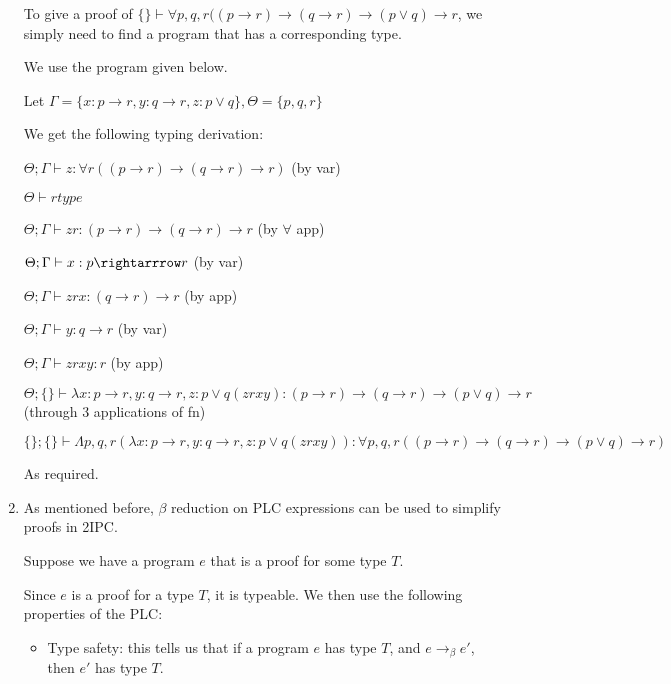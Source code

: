 \begin{enumerate}[label=(\alph*)]
    To give a proof of $\{\} \vdash \forall p,q,r ((p \rightarrow r) \rightarrow (q \rightarrow r) \rightarrow (p \vee q) \rightarrow r$, we simply need to find a program that has a corresponding type.

    We use the program given below.

    Let $\Gamma = \{x : p \rightarrow r, y : q \rightarrow r, z : p \vee q\}, \Theta = \{p,q,r\}$

    We get the following typing derivation:

    $\Theta;\Gamma \vdash z : \forall r((p \rightarrow r) \rightarrow (q \rightarrow r) \rightarrow r)$ (by var)

    $\Theta \vdash r type$

    $\Theta;\Gamma \vdash z r : (p \rightarrow r) \rightarrow (q \rightarrow r) \rightarrow r$ (by $\forall$ app)

    $\Theta;\Gamma \vdash x : p \rightarrrow r$ (by var)

    $\Theta;\Gamma \vdash z r x : (q \rightarrow r) \rightarrow r$ (by app)

    $\Theta;\Gamma \vdash y : q \rightarrow r$ (by var)

    $\Theta;\Gamma \vdash z r x y :r$ (by app)

    $\Theta;\{\} \vdash \lambda x : p \rightarrow r, y : q \rightarrow r, z : p \vee q (z r x y) : (p \rightarrow r) \rightarrow (q \rightarrow r) \rightarrow (p \vee q) \rightarrow r$ (through 3 applications of fn)

    $\{\};\{\} \vdash \Lambda p,q,r (\lambda x : p \rightarrow r, y : q \rightarrow r, z : p \vee q (z r x y)) : \forall p,q,r((p \rightarrow r) \rightarrow (q \rightarrow r) \rightarrow (p \vee q) \rightarrow r)$

    As required.

  \item
    As mentioned before, $\beta$ reduction on PLC expressions can be used to simplify proofs in 2IPC.

    Suppose we have a program $e$ that is a proof for some type $T$.

    Since $e$ is a proof for a type $T$, it is typeable. We then use the following properties of the PLC:

    \begin{itemize}
      \item
        Type safety: this tells us that if a program $e$ has type $T$, and $e \rightarrow_\beta e'$, then $e'$ has type $T$.


\end{itemize}
\end{enumerate}
